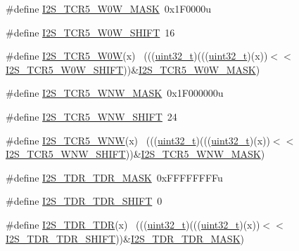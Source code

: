 \begin{DoxyCompactItemize}
\item 
\#define \hyperlink{group___i2_s___register___masks_ga8c6552a52f0e99068ae8869056e78ccb}{I2\+S\+\_\+\+T\+C\+R5\+\_\+\+W0\+W\+\_\+\+M\+A\+SK}~0x1\+F0000u
\item 
\#define \hyperlink{group___i2_s___register___masks_ga0b9f1161cd97d2be7e9ee7f680293e3d}{I2\+S\+\_\+\+T\+C\+R5\+\_\+\+W0\+W\+\_\+\+S\+H\+I\+FT}~16
\item 
\#define \hyperlink{group___i2_s___register___masks_gad188d773cebe6deabdceef93e5050282}{I2\+S\+\_\+\+T\+C\+R5\+\_\+\+W0W}(x)                                                ~(((\hyperlink{_p_e___types_8h_a33594304e786b158f3fb30289278f5af}{uint32\+\_\+t})(((\hyperlink{_p_e___types_8h_a33594304e786b158f3fb30289278f5af}{uint32\+\_\+t})(x))$<$$<$\hyperlink{group___i2_s___register___masks_ga0b9f1161cd97d2be7e9ee7f680293e3d}{I2\+S\+\_\+\+T\+C\+R5\+\_\+\+W0\+W\+\_\+\+S\+H\+I\+FT}))\&\hyperlink{group___i2_s___register___masks_ga8c6552a52f0e99068ae8869056e78ccb}{I2\+S\+\_\+\+T\+C\+R5\+\_\+\+W0\+W\+\_\+\+M\+A\+SK})
\item 
\#define \hyperlink{group___i2_s___register___masks_gac7d0e32e2822b95984bd4c98097848e0}{I2\+S\+\_\+\+T\+C\+R5\+\_\+\+W\+N\+W\+\_\+\+M\+A\+SK}~0x1\+F000000u
\item 
\#define \hyperlink{group___i2_s___register___masks_ga76459cafce1757f4ea37a3fca81514a7}{I2\+S\+\_\+\+T\+C\+R5\+\_\+\+W\+N\+W\+\_\+\+S\+H\+I\+FT}~24
\item 
\#define \hyperlink{group___i2_s___register___masks_ga6702fa197478e6dec76000e98c6eee75}{I2\+S\+\_\+\+T\+C\+R5\+\_\+\+W\+NW}(x)                                                ~(((\hyperlink{_p_e___types_8h_a33594304e786b158f3fb30289278f5af}{uint32\+\_\+t})(((\hyperlink{_p_e___types_8h_a33594304e786b158f3fb30289278f5af}{uint32\+\_\+t})(x))$<$$<$\hyperlink{group___i2_s___register___masks_ga76459cafce1757f4ea37a3fca81514a7}{I2\+S\+\_\+\+T\+C\+R5\+\_\+\+W\+N\+W\+\_\+\+S\+H\+I\+FT}))\&\hyperlink{group___i2_s___register___masks_gac7d0e32e2822b95984bd4c98097848e0}{I2\+S\+\_\+\+T\+C\+R5\+\_\+\+W\+N\+W\+\_\+\+M\+A\+SK})
\item 
\#define \hyperlink{group___i2_s___register___masks_gaa3e1fe9a61d8485d2d6968dfcf779502}{I2\+S\+\_\+\+T\+D\+R\+\_\+\+T\+D\+R\+\_\+\+M\+A\+SK}~0x\+F\+F\+F\+F\+F\+F\+F\+Fu
\item 
\#define \hyperlink{group___i2_s___register___masks_gacf46b25f4f14b34413430bc2071c1a13}{I2\+S\+\_\+\+T\+D\+R\+\_\+\+T\+D\+R\+\_\+\+S\+H\+I\+FT}~0
\item 
\#define \hyperlink{group___i2_s___register___masks_gaa6d27f63a2f11cf4850c33305fc152e6}{I2\+S\+\_\+\+T\+D\+R\+\_\+\+T\+DR}(x)                                                  ~(((\hyperlink{_p_e___types_8h_a33594304e786b158f3fb30289278f5af}{uint32\+\_\+t})(((\hyperlink{_p_e___types_8h_a33594304e786b158f3fb30289278f5af}{uint32\+\_\+t})(x))$<$$<$\hyperlink{group___i2_s___register___masks_gacf46b25f4f14b34413430bc2071c1a13}{I2\+S\+\_\+\+T\+D\+R\+\_\+\+T\+D\+R\+\_\+\+S\+H\+I\+FT}))\&\hyperlink{group___i2_s___register___masks_gaa3e1fe9a61d8485d2d6968dfcf779502}{I2\+S\+\_\+\+T\+D\+R\+\_\+\+T\+D\+R\+\_\+\+M\+A\+SK})
$$
\end{DoxyCompactItemize}
